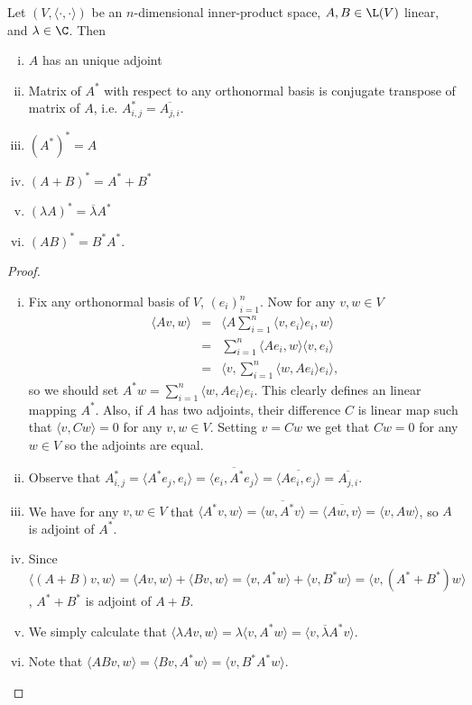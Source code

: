 \begin{lause}
	Let $(V, \langle \cdot, \cdot \rangle)$ be an $n$-dimensional inner-product space, $A, B \in \L(V)$ linear, and $\lambda \in \C$. Then
	\begin{enumerate}[i)]
		\item $A$ has an unique adjoint
		\item Matrix of $A^{*}$ with respect to any orthonormal basis is conjugate transpose of matrix of $A$, i.e. $A^{*}_{i, j} = \overline{A_{j, i}}$.
		\item $(A^{*})^{*} = A$
		\item $(A + B)^{*} = A^{*} + B^{*}$
		\item $(\lambda A)^{*} = \overline{\lambda} A^{*}$
		\item $(AB)^{*} = B^{*}A^{*}$.
	\end{enumerate}
\end{lause}
\begin{proof}
	\begin{enumerate}[i)]
		\item Fix any orthonormal basis of $V$, $(e_{i})_{i = 1}^{n}$. Now for any $v, w \in V$
		\begin{eqnarray*}
			\langle A v, w \rangle &=& \langle A \sum_{i = 1}^{n} \langle v, e_{i} \rangle e_{i}, w\rangle\\
			&=& \sum_{i = 1}^{n} \langle A e_{i}, w \rangle \langle v, e_{i} \rangle \\
			&=& \langle v, \sum_{i = 1}^{n} \langle w, A e_{i} \rangle e_{i} \rangle,
		\end{eqnarray*}
		so we should set $A^{*} w = \sum_{i = 1}^{n} \langle w, A e_{i} \rangle e_{i}$. This clearly defines an linear mapping $A^{*}$. Also, if $A$ has two adjoints, their difference $C$ is linear map such that $\langle v, C w \rangle = 0$ for any $v, w \in V$. Setting $v = C w$ we get that $C w = 0$ for any $w \in V$ so the adjoints are equal.
		\item Observe that $A^{*}_{i, j} = \langle A^{*}e_{j}, e_{i} \rangle = \overline{\langle e_{i}, A^{*} e_{j} \rangle} = \overline{ \langle A e_{i}, e_{j} \rangle} = \overline{A_{j, i}}$.
		\item We have for any $v, w \in V$ that $\langle A^{*} v, w \rangle = \overline{\langle w, A^{*} v \rangle} = \overline{\langle A w, v \rangle} = \langle v, A w \rangle$, so $A$ is adjoint of $A^{*}$.
		\item Since $\langle (A + B) v, w \rangle = \langle A v, w \rangle + \langle B v, w \rangle = \langle v, A^{*} w \rangle + \langle v, B^{*} w \rangle = \langle v, (A^{*} + B^{*})w \rangle$, $A^{*} + B^{*}$ is adjoint of $A + B$.
		\item We simply calculate that $\langle \lambda A v, w \rangle = \lambda \langle v, A^{*} w \rangle = \langle v, \overline{\lambda} A^{*}v \rangle$.
		\item Note that $\langle A B v, w \rangle = \langle B v, A^{*}w \rangle = \langle v, B^{*} A^{*} w \rangle$.
	\end{enumerate}
\end{proof}

